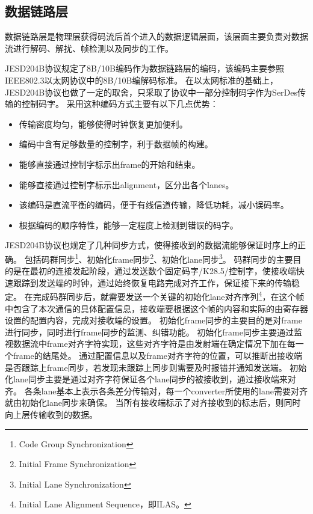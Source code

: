 \documentclass[UTF8]{ctexart}
\begin{document}
\subsection{数据链路层}

数据链路层是物理层获得码流后首个进入的数据逻辑层面，该层面主要负责对数据流进行解码、解扰、帧检测以及同步的工作。

JESD204B协议规定了8B/10B编码作为数据链路层的编码，该编码主要参照IEEE802.3以太网协议中的8B/10B编解码标准。
在以太网标准的基础上，JESD204B协议也做了一定的取舍，只采取了协议中一部分控制码字作为SerDes传输的控制码字。
采用这种编码方式主要有以下几点优势：

\begin{itemize}
\item 传输密度均匀，能够使得时钟恢复更加便利。
\item 编码中含有足够数量的控制字，利于数据帧的构建。
\item 能够直接通过控制字标示出frame的开始和结束。
\item 能够直接通过控制字标示出alignment，区分出各个lanes。
\item 该编码是直流平衡的编码，便于有线信道传输，降低功耗，减小误码率。
\item 根据编码的顺序特性，能够一定程度上检测到错误的码字。
\end{itemize}

JESD204B协议也规定了几种同步方式，使得接收到的数据流能够保证时序上的正确。
包括码群同步\footnote{Code Group Synchronization}、初始化frame同步\footnote{Initial Frame Synchronization}、初始化lane同步\footnote{Initial Lane Synchronization}。
码群同步的主要目的是在最初的连接发起阶段，通过发送数个固定码字/K28.5/控制字，使接收端快速跟踪到发送端的时钟，通过始终恢复电路完成对齐工作，保证接下来的传输稳定。
在完成码群同步后，就需要发送一个关键的初始化lane对齐序列\footnote{Initial Lane Alignment Sequence，即ILAS。}，在这个帧中包含了本次通信的具体配置信息，接收端要根据这个帧的内容和实际的由寄存器设置的配置内容，完成对接收端的设置。
初始化frame同步的主要目的是对frame进行同步，同时进行frame同步的监测、纠错功能。
初始化frame同步主要通过监视数据流中frame对齐字符实现，这些对齐字符是由发射端在确定情况下加在每一个frame的结尾处。
通过配置信息以及frame对齐字符的位置，可以推断出接收端是否跟踪上frame同步，若发现未跟踪上同步则需要及时报错并通知发送端。
初始化lane同步主要是通过对齐字符保证各个lane同步的被接收到，通过接收端来对齐。
各条lane基本上表示各条差分传输对，每一个converter所使用的lane需要对齐就由初始化lane同步来确保。
当所有接收端标示了对齐接收到的标志后，则同时向上层传输收到的数据。
\end{document}

